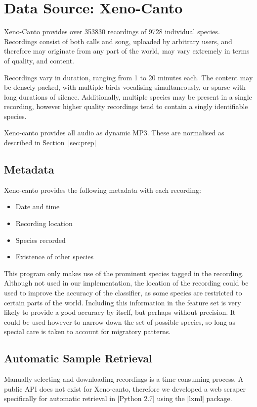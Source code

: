 \section{Data Source: Xeno-Canto}

Xeno-Canto \parencite{xenocanto} provides over 353830 recordings of 9728
individual species.
Recordings consist of both calls and song, uploaded by arbitrary users, and
therefore may originate from any part of the world, may vary extremely in
terms of quality, and content.

Recordings vary in duration, ranging from 1 to 20 minutes each.
The content may be densely packed, with multiple birds vocalising simultaneously,
or sparse with long durations of silence.
Additionally, multiple species may be present in a single recording, however
higher quality recordings tend to contain a singly identifiable species.

Xeno-canto provides all audio as dynamic MP3.
These are normalised as described in Section~\ref{sec:prep}

\subsection{Metadata}
Xeno-canto provides the following metadata with each recording:
\begin{itemize}[noitemsep]
  \item Date and time
  \item Recording location
  \item Species recorded
  \item Existence of other species
\end{itemize}

This program only makes use of the prominent species tagged in the recording.
Although not used in our implementation, the location of the recording could be
used to improve the accuracy of the classifier, as some species are restricted
to certain parts of the world.
Including this information in the feature set is very likely to provide a
good accuracy by itself, but perhaps without precision.
It could be used however to narrow down the set of possible species, so long as
special care is taken to account for migratory patterns.


\subsection{Automatic Sample Retrieval}
Manually selecting and downloading recordings is a time-consuming process.
A public API does not exist for Xeno-canto, therefore we developed a web scraper
specifically for automatic retrieval in |Python 2.7| using the |lxml| package.

